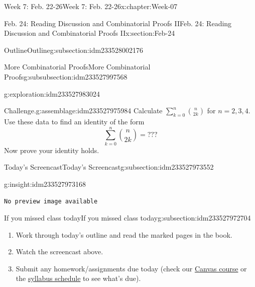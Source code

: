 \documentclass[oneside,10pt,]{book}
\newcommand{\mono}[1]{\texttt{#1}}
\numberwithin{equation}{section}
\newlength{\qrsize}
\newlength{\previewwidth}
\begin{document}
\begin{chapterptx}{Week 7: Feb. 22-26}{}{Week 7: Feb. 22-26}{}{}{x:chapter:Week-07}
\begin{sectionptx}{Feb. 24: Reading Discussion and Combinatorial Proofs II}{}{Feb. 24: Reading Discussion and Combinatorial Proofs II}{}{}{x:section:Feb-24}
\begin{subsectionptx}{Outline}{}{Outline}{}{}{g:subsection:idm233528002176}
\begin{subsubsectionptx}{More Combinatorial Proofs}{}{More Combinatorial Proofs}{}{}{g:subsubsection:idm233527997568}
\begin{exploration}{}{g:exploration:idm233527983024}
\begin{enumerate}
\end{enumerate}
\end{exploration}%
\begin{assemblage}{Challenge.}{g:assemblage:idm233527975984}%
Calculate \(\sum_{k=0}^n \binom{n}{2k}\) for \(n=2,3,4\). Use these data to find an identity of the form%
\begin{equation*}
\sum\limits_{k=0}^n \binom{n}{2k} = ???
\end{equation*}
Now prove your identity holds.%
\end{assemblage}
\end{subsubsectionptx}
\end{subsectionptx}
%
%
\typeout{************************************************}
\typeout{************************************************}
%
\begin{subsectionptx}{Today's Screencast}{}{Today's Screencast}{}{}{g:subsection:idm233527973552}
\begin{insight}{}{g:insight:idm233527973168}%
\setlength{\qrsize}{9em}
\setlength{\previewwidth}{\linewidth}
\addtolength{\previewwidth}{-\qrsize}
\begin{tcbraster}[raster columns=2, raster column skip=1pt, raster halign=center, raster force size=false, raster left skip=0pt, raster right skip=0pt]%
\begin{tcolorbox}[previewstyle, width=\previewwidth]%
\mono{No preview image available}%
\end{tcolorbox}%
\begin{tcolorbox}[qrstyle]%
[QR LINK]\end{tcolorbox}%
\end{tcbraster}%
\end{insight}
\end{subsectionptx}
%
%
\typeout{************************************************}
\typeout{************************************************}
%
\begin{subsectionptx}{If you missed class today}{}{If you missed class today}{}{}{g:subsection:idm233527972704}
%
\begin{enumerate}
\item{}Work through today's outline and read the marked pages in the book.%
\item{}Watch the screencast above.%
\item{}Submit any homework\slash{}assignments due today (check our \href{https://dordt.instructure.com/courses/3110050}{Canvas course} or the \href{https://prof.mkjanssen.org/ds/index.html\#schedule}{syllabus schedule} to see what's due).%

\end{enumerate}
\end{subsectionptx}
\end{sectionptx}
\end{chapterptx}
\end{document}
